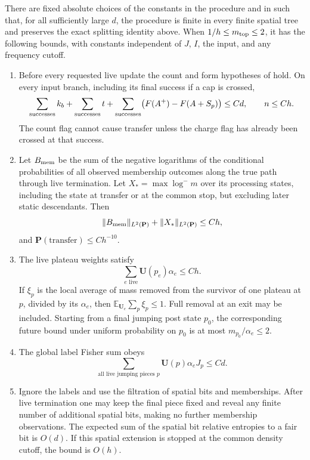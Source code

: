 \begin{proposition}\label{prop:live-budgets}
There are fixed absolute choices of the constants in the procedure
and in  such that, for all sufficiently
large $d$, the procedure is finite in every finite spatial tree and
preserves the exact splitting identity above.  When
$1/h\le m_{\rm top}\le2$, it has the following bounds, with constants
independent of $J$, $I$, the input, and any frequency cutoff.
\begin{enumerate}[label=\textup{(\roman*)},leftmargin=*]
\item Before every requested live update the count and form
hypotheses of  hold.  On every input
branch, including its final success if a cap is crossed,
\[
 \sum_{\rm successes}k_b+\sum_{\rm successes}t
       +\sum_{\rm successes}\bigl(F(A^+)-F(A+S_p)\bigr)\le Cd,
 \qquad n\le C h.
\]
The count flag cannot cause transfer unless the charge flag has
already been crossed at that success.

\item Let $B_{\rm mem}$ be the sum of the negative logarithms of the
conditional probabilities of all observed membership outcomes along
the true path through live termination.  Let
$X_* =\max\log^-m$ over its processing states, including the state
at transfer or at the common stop, but excluding later static
descendants.  Then
\begin{equation}
 \|B_{\rm mem}\|_{L^2(\mathbf P)}
       +\|X_*\|_{L^2(\mathbf P)}\le C h,
 \label{eq:source-12}
\end{equation}
and $\mathbf P(\mathrm{transfer})\le C h^{-10}$.

\item The live plateau weights satisfy
\[
 \sum_{e\text{ live}}\mathbf U(p_e)\alpha_e\le C h.
\]
If $\xi_p$ is the local average of mass removed from the survivor of
one plateau at $p$, divided by its $\alpha_e$, then
$\mathbb E_{\mathbf U_e}\sum_p\xi_p\le1$.  Full removal at an exit
may be included.  Starting from a final jumping post state $p_0$,
the corresponding future bound under uniform probability on $p_0$
is at most $m_{p_0}/\alpha_e\le2$.

\item The global label Fisher sum obeys
\begin{equation}
 \sum_{\text{all live jumping pieces }p}
        \mathbf U(p)\alpha_e J_p\le C d.
 \label{eq:source-13}
\end{equation}
\item Ignore the labels and use the filtration of spatial bits and
memberships.  After live termination one may keep the final piece
fixed and reveal any finite number of additional spatial bits, making
no further membership observations.  The expected sum of the spatial
bit relative entropies to a fair bit is $O(d)$.  If this spatial
extension is stopped at the common density cutoff, the bound is
$O(h)$.
\end{enumerate}
\end{proposition}

